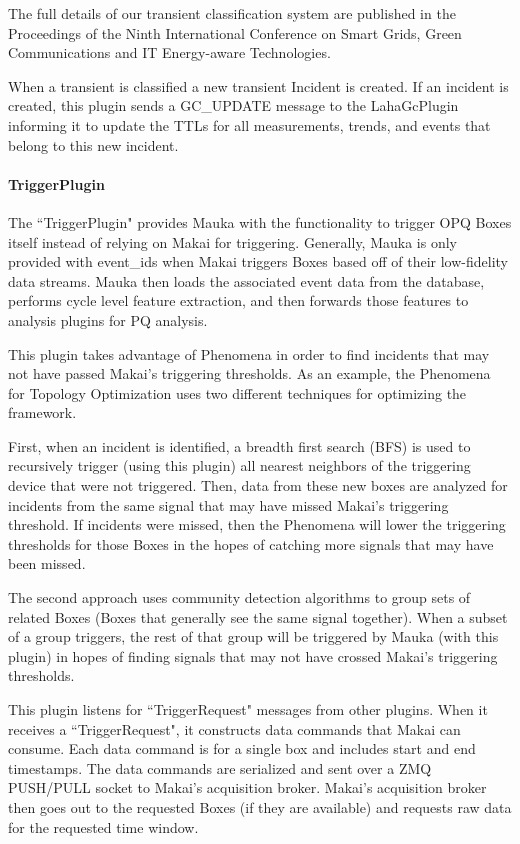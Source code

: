 The full details of our transient classification system are published in the Proceedings of the Ninth International Conference on Smart Grids, Green Communications and IT Energy-aware Technologies\cite{csdl2-19-02}.

When a transient is classified a new transient Incident is created. If an incident is created, this plugin sends a GC\_UPDATE message to the LahaGcPlugin informing it to update the TTLs for all measurements, trends, and events that belong to this new incident.

\paragraph{TriggerPlugin}
The ``TriggerPlugin" provides Mauka with the functionality to trigger OPQ Boxes itself instead of relying on Makai for triggering. Generally, Mauka is only provided with event\_ids when Makai triggers Boxes based off of their low-fidelity data streams. Mauka then loads the associated event data from the database, performs cycle level feature extraction, and then forwards those features to analysis plugins for PQ analysis. 

This plugin takes advantage of Phenomena in order to find incidents that may not have passed Makai's triggering thresholds. As an example, the Phenomena for Topology Optimization uses two different techniques for optimizing the framework. 

First, when an incident is identified, a breadth first search (BFS) is used to recursively trigger (using this plugin) all nearest neighbors of the triggering device that were not triggered. Then, data from these new boxes are analyzed for incidents from the same signal that may have missed Makai's triggering threshold. If incidents were missed, then the Phenomena will lower the triggering thresholds for those Boxes in the hopes of catching more signals that may have been missed. 

The second approach uses community detection algorithms to group sets of related Boxes (Boxes that generally see the same signal together). When a subset of a group triggers, the rest of that group will be triggered by Mauka (with this plugin) in hopes of finding signals that may not have crossed Makai's triggering thresholds. 

This plugin listens for ``TriggerRequest" messages from other plugins. When it receives a ``TriggerRequest", it constructs data commands that Makai can consume. Each data command is for a single box and includes start and end timestamps. The data commands are serialized and sent over a ZMQ PUSH/PULL socket to Makai's acquisition broker. Makai's acquisition broker then goes out to the requested Boxes (if they are available) and requests raw data for the requested time window.

